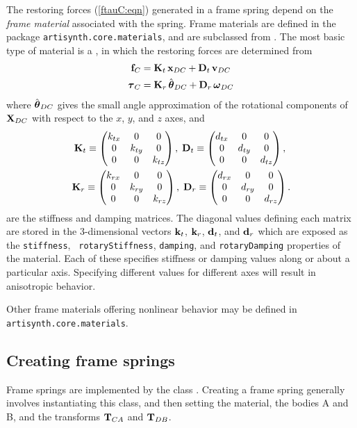 The restoring forces (\ref{ftauC:eqn}) generated in a frame spring
depend on the {\it frame material} associated with the spring. Frame
materials are defined in the package {\tt artisynth.core.materials},
and are subclassed from
.
The most basic type of material is a 
,
in which the restoring forces are determined from
%
\begin{align*}
{\bf f}_C & = 
{\bf K}_{t} \, {\bf x}_{DC} + {\bf D}_{t} \, {\bf v}_{DC} \\
\boldsymbol\tau_C & = 
{\bf K}_{r} \, \hat{\boldsymbol\theta}_{DC} + {\bf D}_{r} \, \boldsymbol\omega_{DC}
\label{flinear:eqn}
\end{align*}
%
where $\hat{\boldsymbol\theta}_{DC}$ gives the small angle approximation of the
rotational components of ${\bf X}_{DC}$ with respect to the $x$, $y$, and
$z$ axes, and
%
\begin{gather*}
{\bf K}_{t} \equiv 
\left(\begin{matrix} k_{tx} & 0 & 0 \\ 0 & k_{ty} & 0 \\ 0 & 0 & k_{tz} \end{matrix}\right), \;
{\bf D}_{t} \equiv 
\left(\begin{matrix} d_{tx} & 0 & 0 \\ 0 & d_{ty} & 0 \\ 0 & 0 & d_{tz} \end{matrix}\right), \;\\
{\bf K}_{r} \equiv
\left(\begin{matrix} k_{r x} & 0 & 0 \\ 0 & k_{r y} & 0 \\ 0 & 0 & k_{r z} \end{matrix}\right), \;
{\bf D}_{r} \equiv
\left(\begin{matrix} d_{r x} & 0 & 0 \\ 0 & d_{r y} & 0 \\ 0 & 0 & d_{r z} \end{matrix}\right).
\end{gather*}
%
are the stiffness and damping matrices. The diagonal values defining
each matrix are stored in the 3-dimensional vectors ${\bf k}_t$, ${\bf k}_r$,
${\bf d}_t$, and ${\bf d}_r$ which are exposed as the {\tt stiffness}, {\tt
rotaryStiffness}, {\tt damping}, and {\tt rotaryDamping} properties of
the material. Each of these specifies stiffness or damping values
along or about a particular axis. Specifying different values for
different axes will result in anisotropic behavior.

Other frame materials offering nonlinear behavior may be defined in
{\tt artisynth.core.materials}.

\subsection{Creating frame springs}
\label{CreatingFrameSprings:sec}

Frame springs are implemented by the class
.  Creating a frame
spring generally involves instantiating this class, and then setting
the material, the bodies A and B, and the transforms ${\bf T}_{CA}$ and
${\bf T}_{DB}$.

